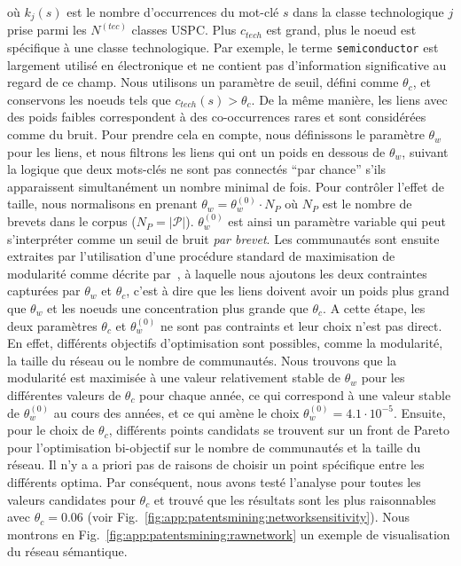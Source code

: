 {où $k_j(s)$ est le nombre d'occurrences du mot-clé $s$ dans la classe technologique $j$ prise parmi les $N^{(tec)}$ classes USPC. Plus $c_{tech}$ est grand, plus le noeud est spécifique à une classe technologique. Par exemple, le terme \texttt{semiconductor} est largement utilisé en électronique et ne contient pas d'information significative au regard de ce champ. Nous utilisons un paramètre de seuil, défini comme $\theta_c$, et conservons les noeuds tels que $c_{tech}(s) > \theta_c$. De la même manière, les liens avec des poids faibles correspondent à des co-occurrences rares et sont considérées comme du bruit. Pour prendre cela en compte, nous définissons le paramètre $\theta_w$ pour les liens, et nous filtrons les liens qui ont un poids en dessous de $\theta_w$, suivant la logique que deux mots-clés ne sont pas connectés ``par chance'' s'ils apparaissent simultanément un nombre minimal de fois. Pour contrôler l'effet de taille, nous normalisons en prenant $\theta_w = \theta_w^{(0)}\cdot N_P$ où $N_P$ est le nombre de brevets dans le corpus ($N_P = \left|\mathcal{P} \right|$). $\theta_w^{(0)}$ est ainsi un paramètre variable qui peut s'interpréter comme un seuil de bruit \emph{par brevet}. Les communautés sont ensuite extraites par l'utilisation d'une procédure standard de maximisation de modularité comme décrite par~\cite{clauset2004finding}, à laquelle nous ajoutons les deux contraintes capturées par $\theta_w$ et $\theta_c$, c'est à dire que les liens doivent avoir un poids plus grand que $\theta_w$ et les noeuds une concentration plus grande que $\theta_c$. A cette étape, les deux paramètres $\theta_c$ et $\theta_w^{(0)}$ ne sont pas contraints et leur choix n'est pas direct. En effet, différents objectifs d'optimisation sont possibles, comme la modularité, la taille du réseau ou le nombre de communautés. Nous trouvons que la modularité est maximisée à une valeur relativement stable de $\theta_w$ pour les différentes valeurs de $\theta_c$ pour chaque année, ce qui correspond à une valeur stable de $\theta_w^{(0)}$ au cours des années, et ce qui amène le choix $\theta_w^{(0)} = 4.1\cdot 10^{-5}$. Ensuite, pour le choix de $\theta_c$, différents points candidats se trouvent sur un front de Pareto pour l'optimisation bi-objectif sur le nombre de communautés et la taille du réseau. Il n'y a a priori pas de raisons de choisir un point spécifique entre les différents optima. Par conséquent, nous avons testé l'analyse pour toutes les valeurs candidates pour $\theta_c$ et trouvé que les résultats sont les plus raisonnables avec $\theta_c = 0.06$ (voir Fig.~\ref{fig:app:patentsmining:networksensitivity}). Nous montrons en Fig.~\ref{fig:app:patentsmining:rawnetwork} un exemple de visualisation du réseau sémantique.
}


